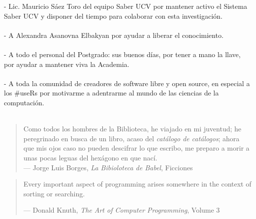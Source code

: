 - Lic. Mauricio Sáez Toro del equipo Saber UCV por mantener activo el Sistema Saber UCV y disponer del tiempo para colaborar con esta investigación.\\\\
- A Alexandra Asanovna Elbakyan por ayudar a liberar el conocimiento.\\\\
- A todo el personal del Postgrado: sus buenos días, por tener a mano la llave, por ayudar a mantener viva la Academia.\\\\
- A toda la comunidad de creadores de software libre y open source, en especial a los \#useRs por motivarme a adentrarme al mundo de las ciencias de la computación.\\\\


\newpage
\thispagestyle{empty}
\vspace*{5cm}
\hfill
\begin{minipage}{0.70\textwidth}
\begin{quote}
Como todos los hombres de la Biblioteca, he viajado en mi juventud; he peregrinado en busca de un libro, acaso del \emph{catálogo de catálogos}; ahora que mis ojos caso no pueden descifrar lo que escribo, me preparo a morir a unas pocas leguas del hexágono en que nací.\\
--- Jorge Luis Borges, \textit{La Bibioloteca de Babel}, Ficciones
\end{quote}
\hspace*{2cm}

\begin{quote}
Every important aspect of programming arises somewhere in the context of sorting or searching.

--- Donald Knuth, \textit{The Art of Computer Programming}, Volume 3
\end{quote}
\end{minipage}

\thispagestyle{empty}
\maketitle


